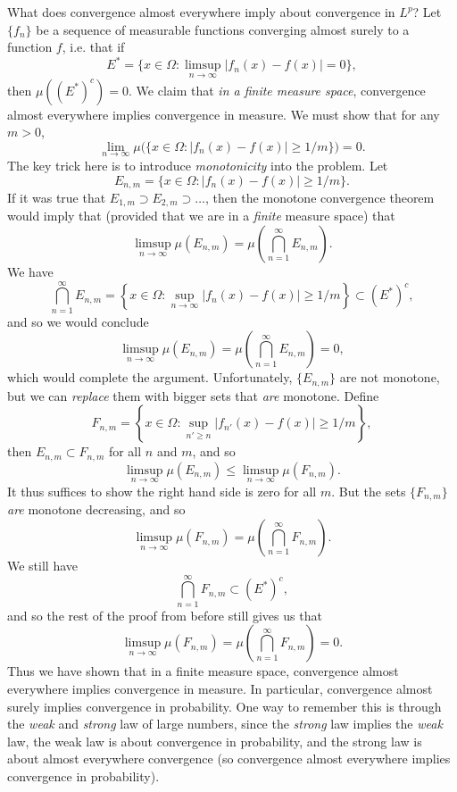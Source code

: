 \documentclass[answers]{exam}
\theoremstyle{problemstyle}
\newcommand{\1}[1]{\textbf{1}_{\left[#1\right]}} %
\begin{document}
What does convergence almost everywhere imply about convergence in $L^p$? Let $\{ f_n \}$ be a sequence of measurable functions converging almost surely to a function $f$, i.e. that if
%
\[ E^* = \{ x \in \Omega : \limsup_{n \to \infty} |f_n(x) - f(x)| = 0 \}, \]
%
then $\mu((E^*)^c) = 0$. We claim that \emph{in a finite measure space}, convergence almost everywhere implies convergence in measure. We must show that for any $m > 0$,
%
\[ \lim_{n \to \infty} \mu \Big ( \{ x \in \Omega : |f_n(x) - f(x)| \geq 1/m \} \Big) = 0. \]
%
The key trick here is to introduce \emph{monotonicity} into the problem. Let
%
\[ E_{n,m} = \{ x \in \Omega : |f_n(x) - f(x)| \geq 1/m \}. \]
%
If it was true that $E_{1,m} \supset E_{2,m} \supset \dots$, then the monotone convergence theorem would imply that (provided that we are in a \emph{finite} measure space) that
%
\[ \limsup_{n \to \infty} \mu(E_{n,m}) = \mu \left( \bigcap_{n = 1}^\infty E_{n,m} \right). \]
%
We have
%
\[ \bigcap_{n = 1}^\infty E_{n,m} = \left\{ x \in \Omega : \sup_{n \to \infty} |f_n(x) - f(x)| \geq 1/m \right\} \subset (E^*)^c, \]
%
and so we would conclude
%
\[ \limsup_{n \to \infty} \mu(E_{n,m}) = \mu \left( \bigcap_{n = 1}^\infty E_{n,m} \right) = 0, \]
%
which would complete the argument. Unfortunately, $\{ E_{n,m} \}$ are not monotone, but we can \emph{replace} them with bigger sets that \emph{are} monotone. Define
%
\[ F_{n,m} = \left\{ x \in \Omega: \sup_{n' \geq n} |f_{n'}(x) - f(x)| \geq 1/m \right\}, \]
%
then $E_{n,m} \subset F_{n,m}$ for all $n$ and $m$, and so
%
\[ \limsup_{n \to \infty} \mu(E_{n,m}) \leq \limsup_{n \to \infty} \mu(F_{n,m}). \]
%
It thus suffices to show the right hand side is zero for all $m$. But the sets $\{ F_{n,m} \}$ \emph{are} monotone decreasing, and so
%
\[ \limsup_{n \to \infty} \mu(F_{n,m}) = \mu \left( \bigcap_{n = 1}^\infty F_{n,m} \right). \]
%
We still have
%
\[ \bigcap_{n = 1}^\infty F_{n,m} \subset (E^*)^c, \]
%
and so the rest of the proof from before still gives us that
%
\[ \limsup_{n \to \infty} \mu(F_{n,m}) = \mu \left( \bigcap_{n = 1}^\infty F_{n,m} \right) = 0. \]
%
Thus we have shown that in a finite measure space, convergence almost everywhere implies convergence in measure. In particular, convergence almost surely implies convergence in probability. One way to remember this is through the \emph{weak} and \emph{strong} law of large numbers, since the \emph{strong} law implies the \emph{weak} law, the weak law is about convergence in probability, and the strong law is about almost everywhere convergence (so convergence almost everywhere implies convergence in probability).
\end{document}
